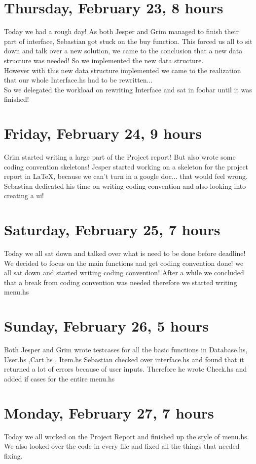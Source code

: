 \documentclass[11pt]{article}
\begin{document}
\section*{Thursday, February 23, 8 hours}
Today we had a rough day! As both Jesper and Grim managed to finish their part of interface, Sebastian got stuck on the buy function.
This forced us all to sit down and talk over a new solution, we came to the conclusion that a new data structure was needed! So we implemented the new data structure. \\
However with this new data structure implemented we came to the realization that our whole Interface.hs had to be rewritten...\\
So we delegated the workload on rewriting Interface and sat in foobar until it was finished!
\section*{Friday, February 24, 9 hours}
Grim started writing a large part of the Project report! But also wrote some coding convention skeletons!
Jesper started working on a skeleton for the project report in LaTeX, because we can't turn in a google doc... that would feel wrong.
Sebastian dedicated his time on writing coding convention and also looking into creating a ui!
\section*{Saturday, February 25, 7 hours}
Today we all sat down and talked over what is need to be done before deadline!
We decided to focus on the main functions and get coding convention done! we all sat down and started writing coding convention!
After a while we concluded that a break from coding convention was needed therefore we started writing menu.hs
\section*{Sunday, February 26, 5 hours}
Both Jesper and Grim wrote testcases for all the basic functions in Database.hs, User.hs ,Cart.hs , Item.hs
Sebastian checked over interface.hs and found that it returned a lot of errors because of user inputs. Therefore he wrote Check.hs and added if cases for the entire menu.hs
\section*{Monday, February 27, 7 hours}
Today we all worked on the Project Report and finished up the style of menu.hs. We also looked over the code in every file and fixed all the things that needed fixing.
\end{document}
